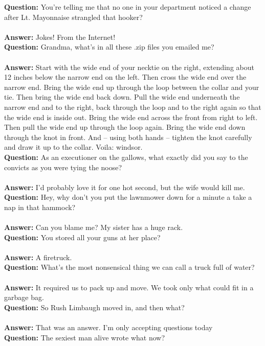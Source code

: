 \documentclass[a4paper]{article}
\begin{document}
\textbf{Question:} You're telling me that no one in your department noticed a change after Lt. Mayonnaise strangled that hooker? \\ \\
\textbf{Answer:} Jokes! From the Internet! \\
\textbf{Question:} Grandma, what's in all these .zip files you emailed me? \\ \\
\textbf{Answer:} Start with the wide end of your necktie on the right, extending about 12 inches below the narrow end on the left. Then cross the wide end over the narrow end. Bring the wide end up through the loop between the collar and your tie. Then bring the wide end back down. Pull the wide end underneath the narrow end and to the right, back through the loop and to the right again so that the wide end is inside out. Bring the wide end across the front from right to left. Then pull the wide end up through the loop again. Bring the wide end down through the knot in front. And -- using both hands -- tighten the knot carefully and draw it up to the collar. Voila: windsor. \\
\textbf{Question:} As an executioner on the gallows, what exactly did you say to the convicts as you were tying the noose? \\ \\
\textbf{Answer:} I'd probably love it for one hot second, but the wife would kill me. \\
\textbf{Question:} Hey, why don't you put the lawnmower down for a minute a take a nap in that hammock? \\ \\
\textbf{Answer:} Can you blame me? My sister has a huge rack. \\
\textbf{Question:} You stored all your guns at her place? \\ \\
\textbf{Answer:} A firetruck. \\
\textbf{Question:} What's the most nonsensical thing we can call a truck full of water? \\ \\
\textbf{Answer:} It required us to pack up and move. We took only what could fit in a garbage bag. \\
\textbf{Question:} So Rush Limbaugh moved in, and then what? \\ \\
\textbf{Answer:} That was an answer. I'm only accepting questions today \\
\textbf{Question:} The sexiest man alive wrote what now?
\end{document}
